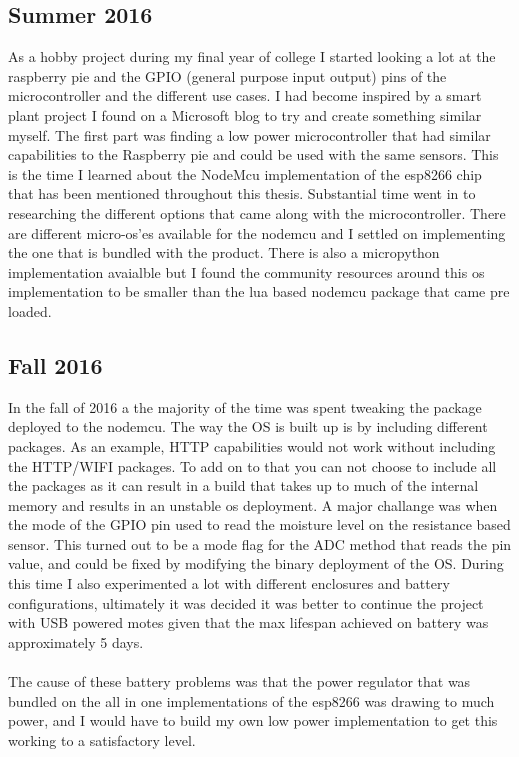 \documentclass[]{uiophd}
\begin{document}
\subsection{Summer 2016}
As a hobby project during my final year of college I started looking a lot at the raspberry pie and the GPIO (general purpose input output) pins of the microcontroller and the different use cases. I had become inspired by a smart plant project I found on a Microsoft blog to try and create something similar myself. The first part was finding a low power microcontroller that had similar capabilities to the Raspberry pie and could be used with the same sensors. This is the time I learned about the NodeMcu implementation of the esp8266 chip that has been mentioned throughout this thesis. Substantial time went in to researching the different options that came along with the microcontroller. There are different micro-os'es available for the nodemcu and I settled on implementing the one that is bundled with the product. There is also a micropython implementation avaialble but I found the community resources around this os implementation to be smaller than the lua based nodemcu package that came pre loaded.
\subsection{Fall 2016}
In the fall of 2016 a the majority of the time was spent tweaking the package deployed to the nodemcu. The way the OS is built up is by including different packages. As an example, HTTP capabilities would not work without including the HTTP/WIFI packages. To add on to that you can not choose to include all the packages as it can result in a build that takes up to much of the internal memory and results in an unstable os deployment. A major challange was when the mode of the GPIO pin used to read the moisture level on the resistance based sensor. This turned out to be a mode flag for the ADC method that reads the pin value, and could be fixed by modifying the binary deployment of the OS. During this time I also experimented a lot with different enclosures and battery configurations, ultimately it was decided it was better to continue the project with USB powered motes given that the max lifespan achieved on battery was approximately 5 days.
\\\\
The cause of these battery problems was that the power regulator that was bundled on the all in one implementations of the esp8266 was drawing to much power, and I would have to build my own low power implementation to get this working to a satisfactory level.
\end{document}
